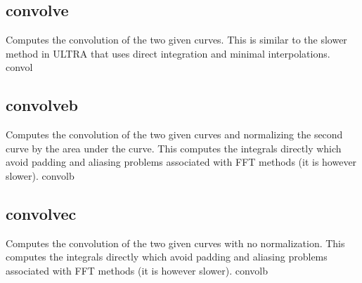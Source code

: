 \documentclass[letterpaper,10pt,english]{sphinxmanual}
\begin{document}
\subsection{convolve}
\label{\detokenize{math_operations:convolve}}
Computes the convolution of the two given curves. This is similar to the slower  method in ULTRA that uses direct integration and minimal interpolations.  convol

\begin{sphinxVerbatim}[commandchars=\\\{\}]
\PYG{p}{[}\PYG{p}{]}    \PYG{p}{[}\PYG{p}{]}
\end{sphinxVerbatim}


\subsection{convolveb}
\label{\detokenize{math_operations:convolveb}}
Computes the convolution of the two given curves and normalizing the second curve by the area under the curve. This computes the integrals directly which avoid padding and aliasing problems associated with FFT methods (it is however slower).  convolb

\begin{sphinxVerbatim}[commandchars=\\\{\}]
\PYG{p}{[}\PYG{p}{]}    \PYG{p}{[}\PYG{p}{]}
\end{sphinxVerbatim}


\subsection{convolvec}
\label{\detokenize{math_operations:convolvec}}
Computes the convolution of the two given curves with no normalization. This computes the integrals directly which avoid padding and aliasing problems associated with FFT methods (it is however slower).  convolb

\begin{sphinxVerbatim}[commandchars=\\\{\}]
\PYG{p}{[}\PYG{p}{]}    \PYG{p}{[}\PYG{p}{]}
\end{sphinxVerbatim}
\end{document}
